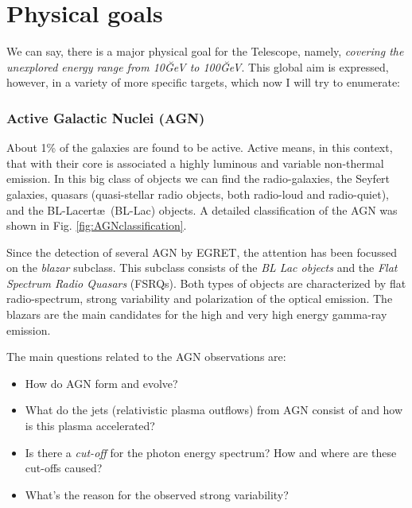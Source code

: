 \CGROenergiesfig

\section{Physical goals}
%
We can say, there is a major physical goal for the \MAGIC Telescope,
namely, \emph{covering the unexplored energy range from 10\u{GeV} to
  100\u{GeV}}. This global aim is expressed, however, in a variety of
more specific targets, which now I will try to enumerate:

\subsubsection*{Active Galactic Nuclei (AGN)} 
%
About 1\% of the galaxies are found to be active. Active means, in this
context, that with their core is associated a highly luminous and
variable non-thermal emission. In this big class of objects we can
find the radio-galaxies, the Seyfert galaxies, quasars (quasi-stellar
radio objects, both radio-loud and radio-quiet), and the BL-Lacert{\ae}\ 
(BL-Lac) objects. A detailed classification of the AGN was shown in
Fig. \ref{fig:AGNclassification}.


Since the detection of several AGN by EGRET, the attention has been
focussed on the \emph{blazar} subclass. This subclass consists of the
\emph{BL Lac objects} and the \emph{Flat Spectrum Radio Quasars}
(FSRQs).  Both types of objects are characterized by flat
radio-spectrum, strong variability and polarization of the optical
emission.  The blazars are the main candidates for the high and very
high energy gamma-ray emission.

The main questions related to the AGN observations are:
%
\begin{itemize}
\item How do AGN form and evolve?
\item What do the jets (relativistic plasma outflows) from AGN consist
  of and how is this plasma accelerated?
\item Is there a \emph{cut-off} for the photon energy spectrum? How
  and where are these cut-offs caused?
\item What's the reason for the observed strong variability?
\end{itemize}

